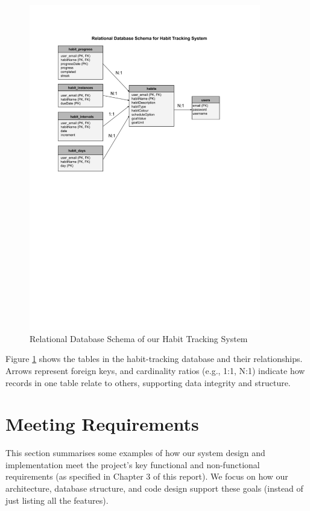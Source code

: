 \begin{figure}[H]
    \centering
    \includegraphics[width=0.9\textwidth]{resources/database_schema.pdf}
    \caption{Relational Database Schema of our Habit Tracking System}
    \label{fig:database_schema}
\end{figure}

Figure \ref{fig:database_schema} shows the tables in the habit-tracking database and their relationships. Arrows represent foreign keys, and cardinality ratios (e.g., 1:1, N:1) indicate how records in one table relate to others, supporting data integrity and structure.

\section{Meeting Requirements}

This section summarises some examples of how our system design and implementation meet the project's key functional and non-functional requirements (as specified in Chapter 3 of this report). We focus on how our architecture, database structure, and code design support these goals (instead of just listing all the features).

